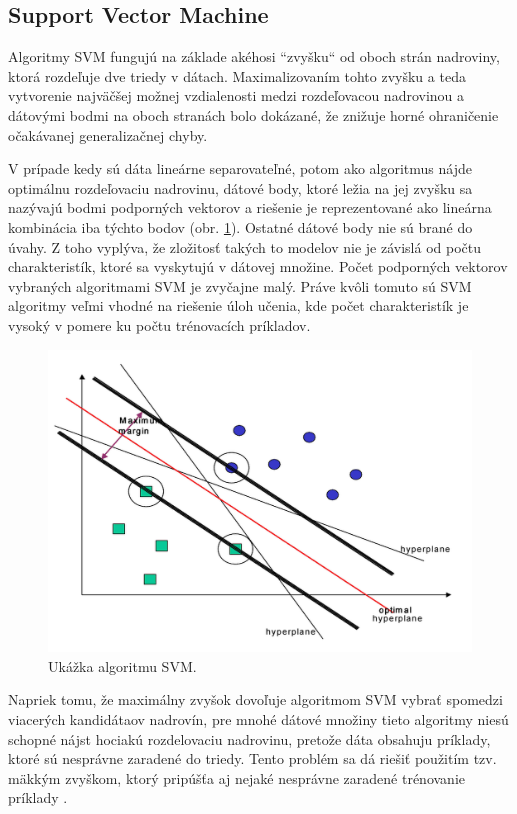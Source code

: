 \subsection{Support Vector Machine}
Algoritmy SVM fungujú na základe akéhosi ``zvyšku`` od oboch strán nadroviny, ktorá rozdeľuje dve triedy v dátach. Maximalizovaním tohto zvyšku a teda vytvorenie najväčšej možnej vzdialenosti medzi rozdeľovacou nadrovinou a dátovými bodmi na oboch stranách bolo dokázané, že znižuje horné ohraničenie očakávanej generalizačnej chyby.\par
V prípade kedy sú dáta lineárne separovateľné, potom ako algoritmus nájde optimálnu rozdeľovaciu nadrovinu, dátové body, ktoré ležia na jej zvyšku sa nazývajú bodmi podporných vektorov a riešenie je reprezentované ako lineárna kombinácia iba týchto bodov (obr. \ref{img:svm}). Ostatné dátové body nie sú brané do úvahy. Z toho vyplýva, že zložitosť takých to modelov nie je závislá od počtu charakteristík, ktoré sa vyskytujú v dátovej množine. Počet podporných vektorov vybraných algoritmami SVM je zvyčajne malý. Práve kvôli tomuto sú SVM algoritmy veľmi vhodné na riešenie úloh učenia, kde počet charakteristík je vysoký v pomere ku počtu trénovacích príkladov.\par
\begin{figure}[H]
	\begin{center}
		\includegraphics[scale=0.3]{img/svm.png}
		\caption{Ukážka algoritmu SVM.}
		\label{img:svm}
	\end{center}
\end{figure}
Napriek tomu, že maximálny zvyšok dovoľuje algoritmom SVM vybrať spomedzi viacerých kandidátaov nadrovín, pre mnohé dátové množiny tieto algoritmy niesú schopné nájst hociakú rozdelovaciu nadrovinu, pretože dáta obsahuju  príklady, ktoré sú nesprávne zaradené do triedy. Tento problém sa dá riešiť použitím tzv. mäkkým zvyškom, ktorý pripúšťa aj nejaké nesprávne zaradené trénovanie príklady \cite{veropoulos1999}.\par
